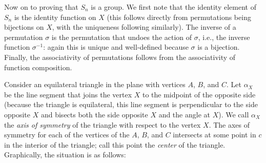 \begin{example}
    Now on to proving that \(S_n\) is a group. We first note that the identity
    element of \(S_n\) is the identity function on \(X\) (this follows directly
    from permutations being bijections on \(X\), with the uniqueness following
    similarly). The inverse of a permutation \(\sigma\) is the permutation that
    undoes the action of \(\sigma\), i.e., the inverse function \(\sigma^{-1}\):
    again this is unique and well-defined because \(\sigma\) is a bijection.
    Finally, the associativity of permutations follows from the associativity of
    function composition.
\end{example}

\begin{example}
    Consider an equilateral triangle in the plane with vertices \(A\), \(B\),
    and \(C\). Let \(\alpha_X\) be the line segment that joins the vertex \(X\)
    to the midpoint of the opposite side (because the triangle is equilateral,
    this line segment is perpendicular to the side opposite \(X\) and bisects
    both the side opposite \(X\) and the angle at \(X\)). We call \(\alpha_X\)
    the \emph{axis of symmetry} of the triangle with respect to the vertex
    \(X\). The axes of symmetry for each of the vertices of the \(A\), \(B\),
    and \(C\) intersects at some point in \(c\) in the interior of the triangle;
    call this point the \emph{center} of the triangle. Graphically, the
    situation is as follows:
    \begin{center}
    \end{center}


\end{example}
